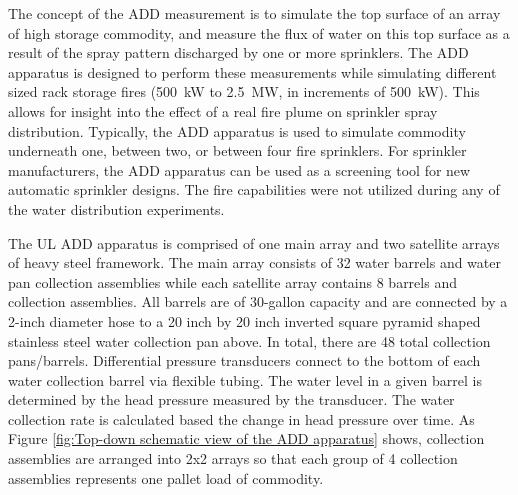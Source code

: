 \documentclass{article}
\begin{document}

The concept of the ADD measurement is to simulate the top surface of an array of high storage commodity, and measure the flux of water on this top surface as a result of the spray pattern discharged by one or more sprinklers. The ADD apparatus is designed to perform these measurements while simulating different sized rack storage fires (500~kW to 2.5~MW, in increments of 500~kW). This allows for insight into the effect of a real fire plume on sprinkler spray distribution. Typically, the ADD apparatus is used to simulate commodity underneath one, between two, or between four fire sprinklers. For sprinkler manufacturers, the ADD apparatus can be used as a screening tool for new automatic sprinkler designs. The fire capabilities were not utilized during any of the water distribution experiments.


The UL ADD apparatus is comprised of one main array and two satellite arrays of heavy steel framework. The main array consists of 32 water barrels and water pan collection assemblies while each satellite array contains 8 barrels and collection assemblies. All barrels are of 30-gallon capacity and are connected by a 2-inch diameter hose to a 20 inch by 20 inch inverted square pyramid shaped stainless steel water collection pan above. In total, there are 48 total collection pans/barrels. Differential pressure transducers connect to the bottom of each water collection barrel via flexible tubing. The water level in a given barrel is determined by the head pressure measured by the transducer. The water collection rate is calculated based the change in head pressure over time. As Figure \ref{fig:Top-down schematic view of the ADD apparatus} shows, collection assemblies are arranged into 2x2 arrays so that each group of 4 collection assemblies represents one pallet load of commodity.
\end{document}
